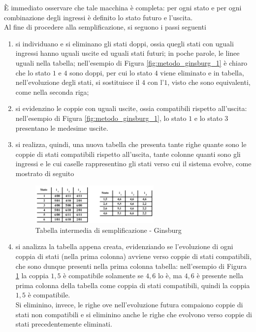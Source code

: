 \documentclass[a4paper]{extarticle}
\begin{document}
\noindent
È immediato osservare che tale macchina è completa: per ogni stato e per ogni combinazione degli ingressi è definito lo stato futuro e l'uscita.\\
Al fine di procedere alla semplificazione, si seguono i passi seguenti
\begin{enumerate}
    \item si individuano e si eliminano gli stati doppi, ossia quegli stati con uguali ingressi hanno uguali uscite ed uguali stati futuri; in poche parole, le linee uguali nella tabella; nell'esempio di Figura \ref{fig:metodo_ginsburg_1} è chiaro che lo stato $1$ e $4$ sono doppi, per cui lo stato $4$ viene eliminato e in tabella, nell'evoluzione degli stati, si sostituisce il $4$ con l'$1$, visto che sono equivalenti, come nella seconda riga;
    \item si evidenzino le coppie con uguali uscite, ossia compatibili rispetto all'uscita: nell'esempio di Figura \ref{fig:metodo_ginsburg_1}, lo stato $1$ e lo stato $3$ presentano le medesime uscite.
    \item si realizza, quindi, una nuova tabella che presenta tante righe quante sono le coppie di stati compatibili rispetto all'uscita, tante colonne quanti sono gli ingressi e le cui caselle rappresentino gli stati verso cui il sistema evolve, come mostrato di seguito
    \begin{figure}[H]
        \centering
        \includegraphics[width=0.6\textwidth]{metodo-ginsburg-2.png}
        \caption{Tabella intermedia di semplificazione - Ginsburg}
        \label{fig:metodo_ginsburg_2}
    \end{figure}
    \item si analizza la tabella appena creata, evidenziando se l'evoluzione di ogni coppia di stati (nella prima colonna) avviene verso coppie di stati compatibili, che sono dunque presenti nella prima colonna tabella: nell'esempio di Figura \ref{fig:metodo_ginsburg_2} la coppia $1,5$ è compatibile solamente se $4,6$ lo è, ma $4,6$ è presente nella prima colonna della tabella come coppia di stati compatibili, quindi la coppia $1,5$ è compatibile.\\
    Si eliminino, invece, le righe ove nell'evoluzione futura compaiono coppie di stati non compatibili e si eliminino anche le righe che evolvono verso coppie di stati precedentemente eliminati.


\end{enumerate}
\end{document}
